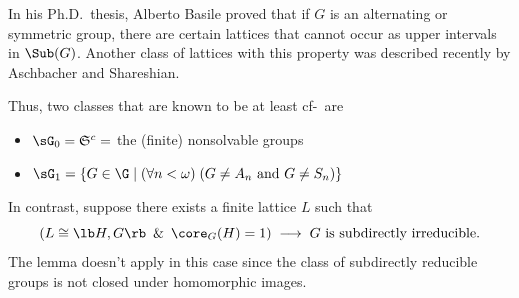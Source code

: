 \begin{frame}[label=ExamplesPreziBasile]{}
In his Ph.D.~thesis, Alberto Basile proved that if
$G$ is an alternating or symmetric group, there are certain lattices that
cannot occur as upper intervals in $\Sub(G)$. 
\vskip5mm
Another class of lattices with
this property was described recently by Aschbacher and Shareshian.
      \begin{center}
    {
        \begin{tikzpicture}[scale=.4]
          
        \end{tikzpicture}
}
      \end{center}
\end{frame}


\begin{frame}[label=ExamplesPreziTwoClasses]{}
Thus, two classes that are known to be at least cf-\IE\ are
\vskip2mm
\begin{itemize}
\item $\sG_0 = \mathfrak{S}^c = $ the (finite) nonsolvable groups
\vskip2mm
\item $\sG_1 =\{G\in \G \mid (\forall n<\omega) \; (G \neq A_n \text{ and }  G\neq S_n) \}$
\end{itemize}
\vskip5mm
\end{frame}


\begin{frame}[label=IEPropsSubdir]{}
In contrast, suppose %
there exists a finite lattice $L$ such that
 \[
 (L \cong \lb H, G \rb \,\text{ \& }\, \core_G(H)=1) \; \longrightarrow \; G
 \text{ is subdirectly irreducible.}  %
\]
The lemma doesn't apply in this case since the class of
subdirectly reducible groups is not closed under homomorphic 
images.
\end{frame}


